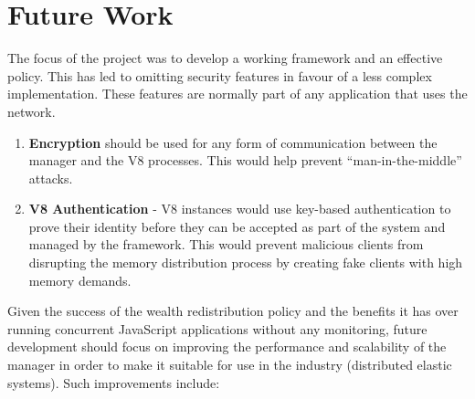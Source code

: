 \documentclass{l4proj}
\begin{document}
\section{Future Work}
\hspace*{1em} The focus of the project was to develop a working framework and an effective policy. This has led to omitting security features in favour of a less complex implementation. These features are normally part of any application that uses the network. 
\begin{enumerate}
\item \textbf{Encryption} should be used for any form of communication between the manager and the V8 processes. This would help prevent ``man-in-the-middle'' attacks.
\item \textbf{V8 Authentication} - V8 instances would use key-based authentication to prove their identity before they can be accepted as part of the system and managed by the framework. This would prevent malicious clients from disrupting the memory distribution process by creating fake clients with high memory demands.
\end{enumerate}
\hspace*{1em} Given the success of the wealth redistribution policy and the benefits it has over running concurrent JavaScript applications without any monitoring, future development should focus on improving the performance and scalability of the manager in order to make it suitable for use in the industry (distributed elastic systems). Such improvements include:
\end{document}
